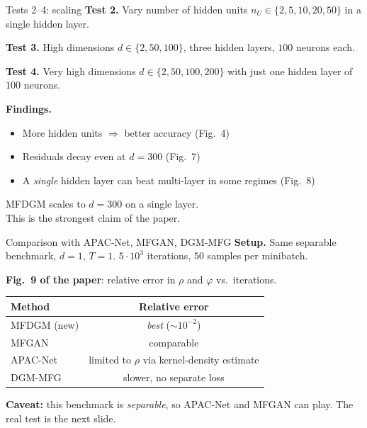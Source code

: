 \documentclass[10pt,aspectratio=169]{beamer}
\newcommand{\teal}[1]{\textcolor{kaustteal}{#1}}
\newcommand{\blue}[1]{\textcolor{kaustblue}{#1}}
\begin{document}
\begin{frame}{Tests 2--4: scaling}
\textbf{Test 2.}  Vary number of hidden units $n_U \in \{2,5,10,20,50\}$
in a single hidden layer.

\medskip
\textbf{Test 3.}  High dimensions $d \in \{2, 50, 100\}$,
three hidden layers, $100$ neurons each.

\medskip
\textbf{Test 4.}  Very high dimensions $d \in \{2, 50, 100, 200\}$ with
just one hidden layer of $100$ neurons.

\medskip
\textbf{Findings.}
\begin{itemize}\setlength\itemsep{1pt}
  \item More hidden units $\Rightarrow$ better accuracy (Fig.\ 4)
  \item Residuals decay even at $d=300$ (Fig.\ 7)
  \item A \emph{single} hidden layer can beat multi-layer in some regimes (Fig.\ 8)
\end{itemize}

\medskip
\begin{recap}[title=Headline]
MFDGM scales to $d = 300$ on a single layer.\\
This is the strongest claim of the paper.
\end{recap}
\end{frame}

\begin{frame}{Comparison with APAC-Net, MFGAN, DGM-MFG}
\textbf{Setup.}  Same separable benchmark, $d=1$, $T=1$.
$5\cdot10^3$ iterations, $50$ samples per minibatch.

\medskip
\textbf{Fig.\ 9 of the paper}: relative error in $\rho$ and $\varphi$ vs.\ iterations.

\medskip
\begin{center}
\begin{tabular}{lc}
\toprule
Method & Relative error \\
\midrule
\teal{MFDGM (new)}        & \emph{best} ($\sim 10^{-2}$) \\
\blue{MFGAN}              & comparable \\
APAC-Net                  & limited to $\rho$ via kernel-density estimate \\
DGM-MFG                   & slower, no separate loss \\
\bottomrule
\end{tabular}
\end{center}

\medskip
\textbf{Caveat:} this benchmark is \emph{separable}, so APAC-Net and
MFGAN can play. The real test is the next slide.
\end{frame}
\end{document}
